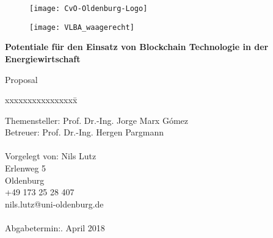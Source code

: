 \begin{titlepage}
  \begin{centering}
  \begin{figure}[h!]
    \centering
    \texttt{[image: CvO-Oldenburg-Logo]}    %
  \end{figure}

  \vspace*{-0.8cm}

  \begin{figure}[h!]
    \centering
    \texttt{[image: VLBA\_waagerecht]}    %
  \end{figure}

  \vspace*{0.4cm}
  
  \textsf{\Huge \textbf{Potentiale für den Einsatz von Blockchain Technologie in der Energiewirtschaft\\}}

  \vspace*{0.5cm}
  \noindent Proposal\\

  \end{centering}
  
  \vspace*{1.5cm}
  \begin{tabbing}
  xxxxxxxxxxxxxxxx\= \kill
  
  \small Themensteller:\> Prof. Dr.-Ing. Jorge Marx Gómez\\
  \small Betreuer:\> Prof. Dr.-Ing. Hergen Pargmann\\\\

  \small Vorgelegt von: \>Nils Lutz\\
  \small \>Erlenweg 5\\
  \small {} Oldenburg\\
  \small \>+49 173 25 28 407\\
  \small \>nils.lutz@uni-oldenburg.de\\\\

  \small Abgabetermin:. April 2018
  \end{tabbing}
\end{titlepage}
\newpage